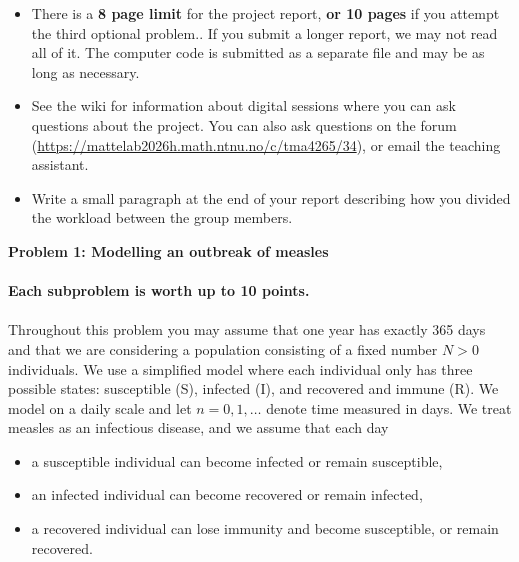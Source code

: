 \documentclass[1p]{article}		%
\begin{document}
\begin{itemize}
  \item
    There is a \textbf{8 page limit} for the project report, \textbf{or 10 pages} if you attempt the third optional problem.. If you submit a longer report, we may not read all of it. The computer code is submitted as a separate file and may be as long as necessary.
  \item
    See the wiki for information about digital sessions where you can ask questions about the project. You can also ask questions on the forum (\url{https://mattelab2026h.math.ntnu.no/c/tma4265/34}), or email the teaching assistant.
  \item
    Write a small paragraph at the end of your report describing how you divided the workload between the group members.
\end{itemize}
\newpage
\vspace{1cm}\noindent
{\LARGE{\textbf{Problem 1: Modelling an outbreak of measles}}}\\\\
\textbf{Each subproblem is worth up to 10 points.} \\\\
\noindent
Throughout this problem you may assume that one year has exactly 365 days and
that we are considering a population consisting of a fixed number $N > 0$ individuals.
We use a simplified model where each individual only has
three possible states: susceptible (S),
infected (I), and recovered and immune (R). We model on a daily scale and let $n = 0, 1, \ldots$ denote time measured in days. 
We treat measles as an infectious disease,
and we assume that each day
\begin{itemize}
  \item[1)] a susceptible individual can become infected or remain susceptible,
  \item[2)] an infected individual can become recovered or remain infected, 
  \item[3)] a recovered individual can lose immunity and become susceptible, or remain recovered. 
\end{itemize}
\end{document}
